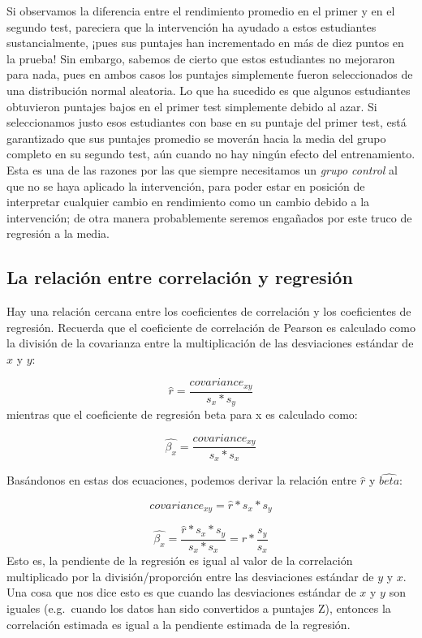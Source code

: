\documentclass[
  12pt,
]{book}
\begin{document}
Si observamos la diferencia entre el rendimiento promedio en el primer y en el segundo test, pareciera que la intervención ha ayudado a estos estudiantes sustancialmente, ¡pues sus puntajes han incrementado en más de diez puntos en la prueba! Sin embargo, sabemos de cierto que estos estudiantes no mejoraron para nada, pues en ambos casos los puntajes simplemente fueron seleccionados de una distribución normal aleatoria. Lo que ha sucedido es que algunos estudiantes obtuvieron puntajes bajos en el primer test simplemente debido al azar. Si seleccionamos justo esos estudiantes con base en su puntaje del primer test, está garantizado que sus puntajes promedio se moverán hacia la media del grupo completo en su segundo test, aún cuando no hay ningún efecto del entrenamiento. Esta es una de las razones por las que siempre necesitamos un \emph{grupo control} al que no se haya aplicado la intervención, para poder estar en posición de interpretar cualquier cambio en rendimiento como un cambio debido a la intervención; de otra manera probablemente seremos engañados por este truco de regresión a la media.

\hypertarget{la-relaciuxf3n-entre-correlaciuxf3n-y-regresiuxf3n}{%
\subsection{La relación entre correlación y regresión}\label{la-relaciuxf3n-entre-correlaciuxf3n-y-regresiuxf3n}}

Hay una relación cercana entre los coeficientes de correlación y los coeficientes de regresión. Recuerda que el coeficiente de correlación de Pearson es calculado como la división de la covarianza entre la multiplicación de las desviaciones estándar de \(x\) y \(y\):

\[
\hat{r} = \frac{covariance_{xy}}{s_x * s_y}
\]
mientras que el coeficiente de regresión beta para x es calculado como:

\[
\hat{\beta_x} = \frac{covariance_{xy}}{s_x*s_x}
\]

Basándonos en estas dos ecuaciones, podemos derivar la relación entre \(\hat{r}\) y \(\hat{beta}\):

\[
covariance_{xy} = \hat{r} * s_x * s_y
\]

\[
\hat{\beta_x} =  \frac{\hat{r} * s_x * s_y}{s_x * s_x} = r * \frac{s_y}{s_x}
\]
Esto es, la pendiente de la regresión es igual al valor de la correlación multiplicado por la división/proporción entre las desviaciones estándar de \(y\) y \(x\). Una cosa que nos dice esto es que cuando las desviaciones estándar de \(x\) y \(y\) son iguales (e.g.~cuando los datos han sido convertidos a puntajes Z), entonces la correlación estimada es igual a la pendiente estimada de la regresión.
\end{document}
